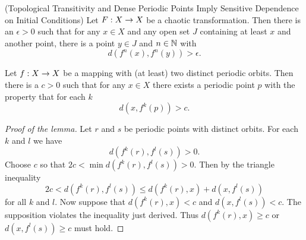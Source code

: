 \documentclass[12pt,draft,twoside]{article}
\begin{document}
\begin{theorem}
  (Topological Transitivity and Dense Periodic Points Imply Sensitive Dependence on Initial Conditions)
  Let $F: X\rightarrow X$ be a chaotic transformation. Then there is an $\epsilon > 0$ such that
  for any $x\in X$ and any open set $J$ containing at least $x$ and another point, there is
  a point $y\in J$ and $n\in \mathbb{N}$ with
  \begin{equation*}
    d(f^n(x),f^n(y)) > \epsilon.
  \end{equation*}
  \label{thm:banks}
\end{theorem}
\begin{lemma}
  Let $f: X\rightarrow X$ be a mapping with (at least) two distinct periodic orbits.
  Then there is a $c > 0$ such that for any $x\in X$ there exists a periodic
  point $p$ with the property that for each $k$
  \begin{equation*}
    d(x, f^k(p)) > c.
  \end{equation*}
\end{lemma}
\begin{proof}[Proof of the lemma]
  Let $r$ and $s$ be periodic points with distinct orbits. For each $k$ and $l$ we have
  \begin{equation*}
    d(f^k(r), f^l(s)) > 0.
  \end{equation*}
  Choose $c$ so that $2c < \min d(f^k(r),f^l(s)) > 0$. Then by the triangle inequality
  \begin{equation*}
    2c < d(f^k(r),f^l(s)) \leq d(f^k(r),x) + d(x,f^l(s))
  \end{equation*}
  for all $k$ and $l$. Now suppose that $d(f^k(r),x)<c$ and $d(x,f^l(s))<c$. The supposition
  violates the inequality just derived. Thus $d(f^k(r),x) \geq c$ or $d(x,f^l(s)) \geq c$ must hold.
\end{proof}
\end{document}
